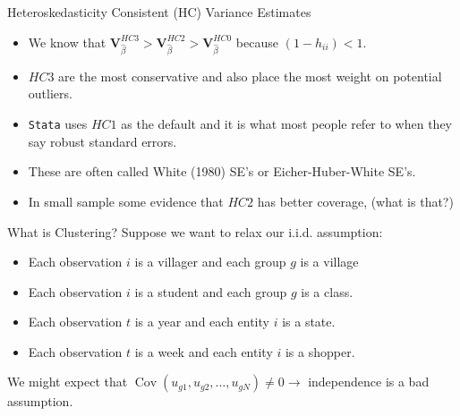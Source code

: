 \begin{frame}{Heteroskedasticity Consistent (HC) Variance Estimates}
\begin{itemize}
\item We know that $\mathbf{V}_{\widehat{\beta}}^{HC3} > \mathbf{V}_{\widehat{\beta}}^{HC2} > \mathbf{V}_{\widehat{\beta}}^{HC0}$ because $(1- h_{ii}) <1$.
\item $HC3$ are the most \alert{conservative} and also place the most weight on potential outliers.
\item \texttt{Stata} uses $HC1$ as the default and it is what most people refer to when they say \alert{robust standard errors}.
\item These are often called White (1980) SE's or Eicher-Huber-White SE's.
\item In small sample some evidence that $HC2$ has better \alert{coverage}, (what is that?)
\end{itemize}
\end{frame}


\begin{frame}{What is Clustering?}
Suppose we want to relax our i.i.d. assumption:
\begin{itemize}
\item Each observation $i$ is a \alert{villager} and each group $g$ is a \alert{village}
\item Each observation $i$ is a \alert{student} and each group $g$ is a \alert{class}.
\item Each observation $t$ is a \alert{year} and each entity $i$ is a \alert{state}.
\item Each observation $t$ is a \alert{week} and each entity $i$ is a \alert{shopper}.
\end{itemize}
We might expect that $\operatorname { Cov } (u_{g1},u_{g2},\ldots,u_{gN}) \neq 0 \rightarrow$ independence is a bad assumption. 
\end{frame}

